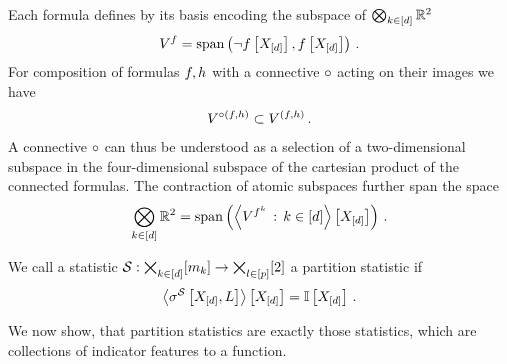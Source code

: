 
\begin{example}
    Each formula defines by its basis encoding the subspace of $\bigotimes_{k\in[d]}\mathbb{R}^2$
    \begin{align*}
        V^{f} = \mathrm{span}\left(\lnot f\left[X_{[d]}\right],f\left[X_{[d]}\right]\right) \, .
    \end{align*}
    For composition of formulas $f,h$ with a connective $\circ$ acting on their images we have %
    \begin{align*}
        V^{\circ(f,h)}
        \subset V^{(f,h)} \, .
    \end{align*}
    A connective $\circ$ can thus be understood as a selection of a two-dimensional subspace in the four-dimensional subspace of the cartesian product of the connected formulas.
    The contraction of atomic subspaces further span the space
    \begin{align*}
        \bigotimes_{k\in[d]}\mathbb{R}^2 = \mathrm{span}\left(\left\langle 
            V^{f^{k}} \,:\, k\in[d]
        \right\rangle \left[ X_{[d]} \right]\right) \, .
    \end{align*}
\end{example}


\label{sec:partitionStatistics}

\begin{definition}
    \label{def:partitionStatistic}
    We call a statistic $\mathcal{S} : \bigtimes_{k\in[d]}[m_{k}] \rightarrow \bigtimes_{l\in[p]}[2]$ a partition statistic if
    \begin{align*}
        \left\langle \sigma^{\mathcal{S}}\left[X_{[d]},L\right]\right\rangle \left[ X_{[d]} \right] = \mathbb{I}\left[X_{[d]}\right] \, .
    \end{align*}
\end{definition}

We now show, that partition statistics are exactly those statistics, which are collections of indicator features to a function.

